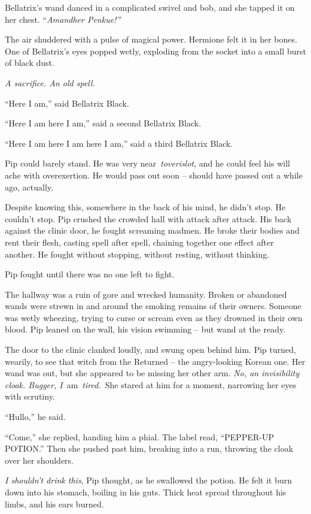Bellatrix's wand danced in a complicated swivel and bob, and she tapped
it on her chest. ``\emph{Amandher Penkue!''}

The air shuddered with a pulse of magical power. Hermione felt it in her
bones. One of Bellatrix's eyes popped wetly, exploding from the socket
into a small burst of black dust.

\emph{A sacrifice. An old spell.}

``Here I am,'' said Bellatrix Black.

``Here I am here I am,'' said a second Bellatrix Black.

``Here I am here I am here I am,'' said a third Bellatrix Black.

\mybreak

Pip could barely stand. He was very near~\emph{toverislot}, and he could
feel his will ache with overexertion. He would pass out soon -- should
have passed out a while ago, actually.

Despite knowing this, somewhere in the back of his mind, he didn't stop.
He couldn't stop. Pip crushed the crowded hall with attack after attack.
His back against the clinic door, he fought screaming madmen. He broke
their bodies and rent their flesh, casting spell after spell, chaining
together one effect after another. He fought without stopping, without
resting, without thinking.

Pip fought until there was no one left to fight.

The hallway was a ruin of gore and wrecked humanity. Broken or abandoned
wands were strewn in and around the smoking remains of their owners.
Someone was wetly wheezing, trying to curse or scream even as they
drowned in their own blood. Pip leaned on the wall, his vision swimming
-- but wand at the ready.

The door to the clinic clanked loudly, and swung open behind him. Pip
turned, wearily, to see that witch from the Returned -- the
angry-looking Korean one. Her wand was out, but she appeared to be
missing her other arm. \emph{No, an invisibility cloak. Bugger,
I}~am~\emph{tired.}~She stared at him for a moment, narrowing her eyes
with scrutiny.

``Hullo,'' he said.

``Come,'' she replied, handing him a phial. The label read, ``PEPPER-UP
POTION.'' Then she pushed past him, breaking into a run, throwing the
cloak over her shoulders.

\emph{I shouldn't drink this}, Pip thought, as he swallowed the potion.
He felt it burn down into his stomach, boiling in his guts. Thick heat
spread throughout his limbs, and his ears burned.

